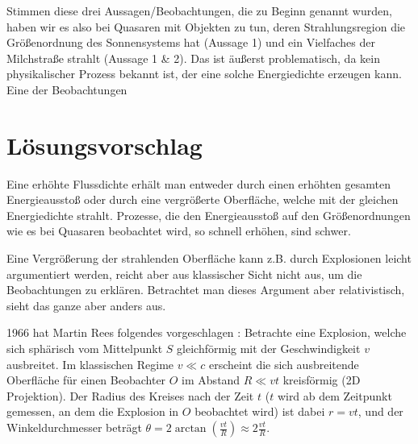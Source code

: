 Stimmen diese drei Aussagen/Beobachtungen, die zu Beginn genannt wurden, haben wir es also bei Quasaren mit Objekten zu tun, deren Strahlungsregion die Größenordnung des Sonnensystems hat (Aussage 1) und ein Vielfaches der Milchstraße strahlt (Aussage 1 \& 2).  Das ist äußerst problematisch, da kein physikalischer Prozess bekannt ist, der eine solche Energiedichte erzeugen kann. Eine der Beobachtungen

\section{Lösungsvorschlag}
Eine erhöhte Flussdichte erhält man entweder durch einen erhöhten gesamten Energieausstoß oder durch eine vergrößerte Oberfläche, welche mit der gleichen Energiedichte strahlt. Prozesse, die den Energieausstoß auf den Größenordnungen wie es bei Quasaren beobachtet wird, so schnell erhöhen, sind schwer.

Eine Vergrößerung der strahlenden Oberfläche kann z.B. durch Explosionen leicht argumentiert werden, reicht aber aus klassischer Sicht nicht aus, um die Beobachtungen zu erklären. Betrachtet man dieses Argument aber relativistisch, sieht das ganze aber anders aus.

1966 hat Martin Rees folgendes vorgeschlagen \autocite{rees}:
Betrachte eine Explosion, welche sich sphärisch vom Mittelpunkt \( S \) gleichförmig mit der Geschwindigkeit \( v \) ausbreitet. Im klassischen Regime \( v \ll c \) erscheint die sich ausbreitende Oberfläche für einen Beobachter \( O \) im Abstand \( R \ll vt \) kreisförmig (2D Projektion). Der Radius des Kreises nach der Zeit \( t \) (\( t \) wird ab dem Zeitpunkt gemessen, an dem die Explosion in \( O \) beobachtet wird) ist dabei \( r = vt \), und der Winkeldurchmesser beträgt \( \theta = 2\arctan(\tfrac{vt}{R}) \approx 2\tfrac{vt}{R} \).

